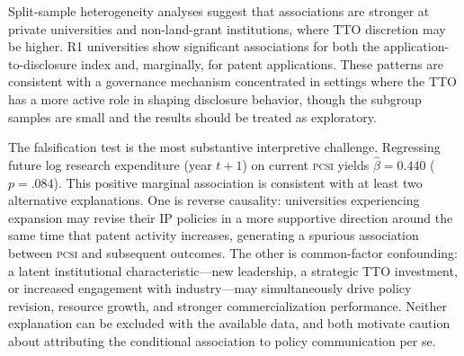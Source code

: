 \documentclass[12pt]{article}
\newcommand{\PCSI}{\textsc{pcsi}}
\begin{document}
Split-sample heterogeneity analyses suggest that associations are stronger at private
universities and non-land-grant institutions, where TTO discretion may be higher. R1
universities show significant associations for both the application-to-disclosure index
and, marginally, for patent applications. These patterns are consistent with a governance
mechanism concentrated in settings where the TTO has a more active role in shaping
disclosure behavior, though the subgroup samples are small and the results should be
treated as exploratory.

The falsification test is the most substantive interpretive challenge. Regressing
future log research expenditure (year $t+1$) on current \PCSI{} yields $\hat\beta = 0.440$
($p = .084$). This positive marginal association is consistent with at least two
alternative explanations. One is reverse causality: universities experiencing expansion
may revise their IP policies in a more supportive direction around the same time that
patent activity increases, generating a spurious association between \PCSI{} and
subsequent outcomes. The other is common-factor confounding: a latent institutional
characteristic---new leadership, a strategic TTO investment, or increased engagement
with industry---may simultaneously drive policy revision, resource growth, and stronger
commercialization performance. Neither explanation can be excluded with the available
data, and both motivate caution about attributing the conditional association to
policy communication per se.
\end{document}
